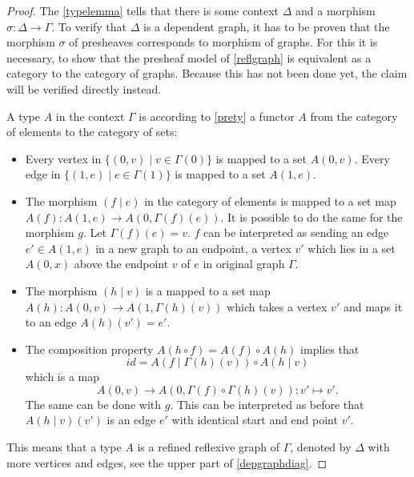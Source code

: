 \documentclass[12pt,a4paper,twoside,xetex]{book} %
\begin{document}
\begin{proof} 

The \cref{typelemma} tells that there is some context $\Delta$ and a morphism $\sigma : \Delta \rightarrow \Gamma$. To verify that $\Delta$ is a dependent graph, it has to be proven that the morphism $\sigma$ of presheaves corresponds to morphism of graphs. For this it is necessary, to show that the presheaf model of \cref{reflgraph} is equivalent as a category to the category of graphs. Because this has not been done yet, the claim will be verified directly instead. 

A type $A$ in the context $\Gamma$ is according to \cref{prety} a functor $A$ from the category of elements to the category of sets:

\begin{itemize}
\item Every vertex in $\{ (0, v) \mid v \in \Gamma (0) \}$ is mapped to a set 
$A(0,v)$. Every edge in $\{ (1, e) \mid e \in \Gamma (1) \}$ is mapped to a set 
$A(1,e)$.

\item The morphism $(f \mid e)$ in the category of elements is mapped to a set 
map $A(f): A(1,e) \rightarrow A(0, \Gamma (f) (e))$.  It is possible to do the 
same for the morphism $g$. Let $\Gamma (f) (e) =v$. $f$ can be interpreted as 
sending an edge $e' \in A(1,e)$ in a new graph to an endpoint, a vertex $v'$ 
which lies in a set $A(0, x)$ above the endpoint $v$ of $e$ in original graph 
$\Gamma$.
 
\item The morphism $(h \mid v)$ is a mapped to a set map $A(h) : A(0,v) 
\rightarrow A(1, \Gamma (h) (v) )$ which takes a vertex $v'$ and maps it to an 
edge $A(h)(v')=e'$.

\item The composition property $A(h \circ f) = A(f) \circ A(h)$ implies that 
$$id = A \left( f \mid \Gamma (h) (v) \right) \circ A \left( h \mid v \right)$$ 
which is a map $$A(0,v) \rightarrow A(0, \Gamma (f) \circ \Gamma (h) (v)): v' 
\mapsto v'.$$ The same can be done with $g$. This can be interpreted as before 
that $A(h \mid v)(v')$ is an edge $e'$ with identical start and end point $v'$.
\end{itemize}

This means that a type $A$ is a refined reflexive graph of $\Gamma$, denoted by $\Delta$ with more 
vertices and edges, see the upper part of \cref{depgraphdiag}.



\end{proof}
\end{document}
